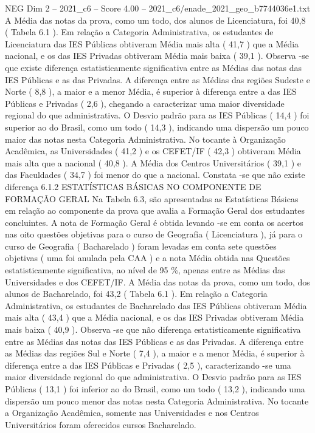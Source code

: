 \begin{textsample}{NEG Dim 2 – 2021\_c6 – Score 4.00 – 2021\_c6/enade\_2021\_geo\_b7744036e1.txt}
A Média das notas da prova, como um todo, dos alunos de Licenciatura, foi 40,8 ( Tabela 6.1 ).
Em relação a Categoria Administrativa, os estudantes de Licenciatura das IES Públicas obtiveram Média mais alta ( 41,7 ) que a Média nacional, e os das IES Privadas obtiveram Média mais baixa ( 39,1 ).
Observa -se que existe diferença estatisticamente significativa entre as Médias das notas das IES Públicas e as das Privadas.
A diferença entre as Médias das regiões Sudeste e Norte ( 8,8 ), a maior e a menor Média, é superior à diferença entre a das IES Públicas e Privadas ( 2,6 ), chegando a caracterizar uma maior diversidade regional do que administrativa.
O Desvio padrão para as IES Públicas ( 14,4 ) foi superior ao do Brasil, como um todo ( 14,3 ), indicando uma dispersão um pouco maior das notas nesta Categoria Administrativa.
No tocante à Organização Acadêmica, as Universidades ( 41,2 ) e os CEFET/IF ( 42,3 ) obtiveram Média mais alta que a nacional ( 40,8 ).
A Média dos Centros Universitários ( 39,1 ) e das Faculdades ( 34,7 ) foi menor do que a nacional.
Constata -se que não existe diferença 6.1.2 ESTATÍSTICAS BÁSICAS NO COMPONENTE DE FORMAÇÃO GERAL Na Tabela 6.3, são apresentadas as Estatísticas Básicas em relação ao componente da prova que avalia a Formação Geral dos estudantes concluintes.
A nota de Formação Geral é obtida levando -se em conta os acertos nas oito questões objetivas para o curso de Geografia ( Licenciatura ), já para o curso de Geografia ( Bacharelado ) foram levadas em conta sete questões objetivas ( uma foi anulada pela CAA ) e a nota Média obtida nas Questões estatisticamente significativa, ao nível de 95 \%, apenas entre as Médias das Universidades e dos CEFET/IF.
A Média das notas da prova, como um todo, dos alunos de Bacharelado, foi 43,2 ( Tabela 6.1 ).
Em relação a Categoria Administrativa, os estudantes de Bacharelado das IES Públicas obtiveram Média mais alta ( 43,4 ) que a Média nacional, e os das IES Privadas obtiveram Média mais baixa ( 40,9 ).
Observa -se que não diferença estatisticamente significativa entre as Médias das notas das IES Públicas e as das Privadas.
A diferença entre as Médias das regiões Sul e Norte ( 7,4 ), a maior e a menor Média, é superior à diferença entre a das IES Públicas e Privadas ( 2,5 ), caracterizando -se uma maior diversidade regional do que administrativa.
O Desvio padrão para as IES Públicas ( 13,1 ) foi inferior ao do Brasil, como um todo ( 13,2 ), indicando uma dispersão um pouco menor das notas nesta Categoria Administrativa.
No tocante a Organização Acadêmica, somente nas Universidades e nos Centros Universitários foram oferecidos cursos Bacharelado.

\end{textsample}
